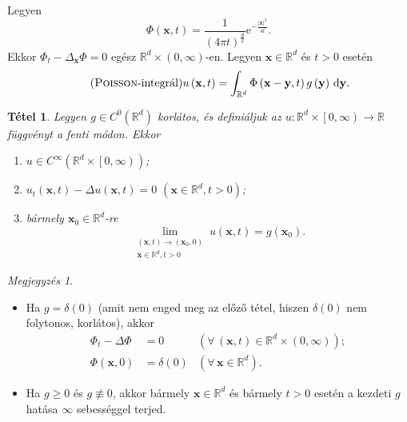 \documentclass[DIV=15,appendixprefix]{scrreprt}
\newtheorem*{tetel}{Tétel}
\theoremstyle{definition}
\theoremstyle{remark}
\newtheorem*{megj}{Megjegyzés}
\begin{document}
Legyen
\begin{equation}\tag{fundamentális megoldás}
	\Phi \left( \mathbf{ x },{} t \right) = \frac{ 1 }{ \left( 4 \pi t \right)^{ \frac{ d }{ 2 } } }
	\mathrm{ e }^{ - \frac{ \left| \mathbf{ x } \right|^{ 2 } }{ 4 t } }.
\end{equation}
Ekkor $ \Phi_{ t } - \Delta_{ \mathbf{ x } } \Phi = 0 $ egész $ \mathbb{ R }^{ d } \times \left(
0,{} \infty \right) $-en. Legyen $ \mathbf{ x } \in \mathbb{ R }^{ d } $ és $ t > 0 $ esetén
\begin{equation}\tag{\textsc{Poisson}-integrál}
	u \left( \mathbf{ x },{} t \right) = \int_{ \mathbb{ R }^{ d } } \Phi \left( \mathbf{ x } -
	\mathbf{ y },{} t \right) g \left( \mathbf{ y } \right) \, \mathrm{ d } \mathbf{ y }.
\end{equation}
\begin{tetel}
	Legyen $ g \in C^{ 0 } \left( \mathbb{ R }^{ d } \right) $ korlátos, és definiáljuk az $ u
	\colon \mathbb{ R }^{ d } \times \left.\left[ 0,{} \infty \right)\right. \rightarrow
	\mathbb{ R } $ függvényt a fenti módon. Ekkor
	\begin{enumerate}
		\item $ u \in C^{ \infty } \left( \mathbb{ R }^{ d } \times \left.\left[ 0,{} \infty
		\right)\right. \right)$;
		\item $ u_{ t } \left( \mathbf{ x },{} t \right) - \Delta u \left( \mathbf{ x },{} t \right)
		= 0 $ $ \left( \mathbf{ x } \in \mathbb{ R }^{ d },{} t > 0 \right) $;
		\item bármely $ \mathbf{ x }_{ 0 } \in \mathbb{ R }^{ d } $-re
		\begin{equation*}
			\lim_{ \substack{ \left( \mathbf{ x },{} t \right) \rightarrow \left(
			\mathbf{ x }_{ 0 },{} 0 \right)\\\mathbf{ x } \in \mathbb{ R }^{ d },{} t > 0 } } u
			\left( \mathbf{ x },{} t \right) = g \left( \mathbf{ x }_{ 0 } \right).
		\end{equation*}
	\end{enumerate}
\end{tetel}
\begin{megj}\leavevmode
	\begin{itemize}
		\item Ha $ g = \delta \left( 0 \right) $ (amit nem enged meg az előző tétel, hiszen $ \delta
			\left( 0 \right) $ nem folytonos, korlátos), akkor
			\begin{align*}
				\Phi_{ t } - \Delta \Phi &= 0 & \left( \forall \, \left( \mathbf{ x },{} t \right)
					\in \mathbb{ R }^{ d } \times \left( 0,{} \infty \right) \right);\\
				\Phi \left( \mathbf{ x },{} 0 \right) &= \delta \left( 0 \right) & \left( \forall \,
					\mathbf{ x } \in \mathbb{ R }^{ d } \right).
			\end{align*}
		\item Ha $ g \ge 0 $ és $ g \not \equiv 0 $, akkor bármely $ \mathbf{ x } \in
			\mathbb{ R }^{ d } $ és bármely $ t > 0 $ esetén a kezdeti $ g $ hatása $ \infty $
			sebességgel terjed.
	\end{itemize}
\end{megj}
\end{document}
